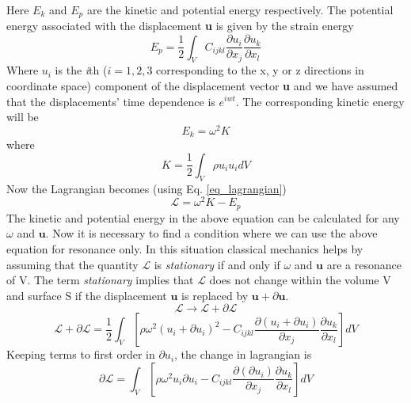 \begin{doublespacing}
Here $E_k$ and $E_p$ are the kinetic and potential energy respectively. The potential energy associated with the displacement \textbf{u} is given by the strain energy
\begin{equation}
E_p = \frac{1}{2} \int_V C_{ijkl} \frac{\partial{u_i}}{\partial{x_j}} \frac{\partial{u_k}}{\partial{x_l}}
\end{equation}
Where $u_i$ is the \textit{i}th ($i=1,2,3 $ corresponding to the x, y or z directions in coordinate space) component of the displacement vector \textbf{u} and we have assumed that the displacements' time dependence is $e^{iwt}$. The corresponding kinetic energy will be 
\begin{equation}
E_k = \omega^2 K
\end{equation}
where
\begin{equation}
\label{eq_kmatrix}
K = \frac{1}{2} \int_V \rho u_i u_i dV
\end{equation}
Now the Lagrangian becomes (using Eq. \ref{eq_lagrangian})
\begin{equation}
\label{eq_lagrangian_2}
\mathcal{L} = \omega^2 K - E_p
\end{equation}
The kinetic and potential energy in the above equation can be calculated for any $\omega$ and $\textbf{u}$. Now it is necessary to find a condition where we can use the above equation for resonance only. In this situation classical mechanics helps by assuming that the quantity $\mathcal{L}$ is \textit{stationary} if and only if $\omega$ and $\textbf{u}$ are a resonance of V. The term \textit{stationary} implies that $\mathcal{L}$ does not change within the volume V and surface S if the displacement $\textbf{u}$ is replaced by $\textbf{u}+\partial{\textbf{u}}$.
\begin{equation}
\mathcal{L} \rightarrow \mathcal{L} + \partial{\mathcal{L}}
\end{equation}
\begin{equation}
\mathcal{L} + \partial{\mathcal{L}} = \frac{1}{2}\int_V\left[\rho \omega^2 (u_i + \partial{u_i})^2 - C_{ijkl}\frac{\partial(u_i + \partial{u_i})}{\partial{x_j}} \frac{\partial{u_k}}{\partial{x_l}} \right] dV
\end{equation}
Keeping terms to first order in $\partial{u_i}$, the change in lagrangian is 
\begin{equation}
\partial{\mathcal{L}} = \int_V \left [\rho \omega^2 u_i \partial{u_i} - C_{ijkl} \frac{\partial(\partial{u_i})}{\partial{x_j}} \frac{\partial{u_k}}{\partial{x_l}} \right ]dV
\end{equation}

\end{doublespacing}
